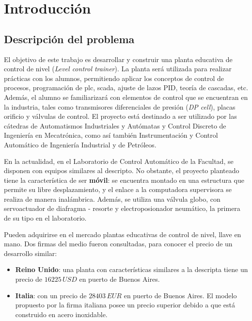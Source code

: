\chapter{Introducción}
\label{ch:intro}

\section{Descripción del problema}
\label{sec:DescripcionProblema}
El objetivo de este trabajo es desarrollar y construir una planta
educativa de control de nivel
(\textit{Level control trainer}).
La planta será utilizada para realizar prácticas con los
alumnos, permitiendo aplicar los conceptos de
control de procesos, programación de \gls{plc}, \gls{scada},
ajuste de lazos PID, teoría de cascadas, etc.
Además, el alumno se familiarizará con elementos de control que
se encuentran en la industria, tales como transmisores diferenciales de presión
(\textit{DP cell}), placas orificio y válvulas de control.
El proyecto está destinado a ser utilizado por las cátedras de
Automatismos Industriales y Autómatas y Control Discreto de
Ingeniería en Mecatrónica,
como así también Instrumentación y Control Automático de Ingeniería Industrial
y de Petróleos.

En la actualidad, en el Laboratorio de Control Automático de la Facultad, 
se disponen con equipos similares al descripto.
No obstante, el proyecto planteado tiene la característica de ser 
\textbf{móvil}: se encuentra montado en una estructura que 
permite su libre desplazamiento, y el enlace a la
computadora supervisora se realiza de manera inalámbrica.
Además, se utiliza una válvula globo, con servoactuador de diafragma - resorte
y electroposionador neumático, la primera de su tipo en el laboratorio.

Pueden adquirirse en el mercado plantas educativas de control de nivel, llave
en mano.
Dos firmas del medio fueron consultadas, para conocer 
el precio de un desarrollo similar:
\begin{itemize}
 \item \textbf{Reino Unido}: una planta con características similares
 a la descripta tiene un precio de $16225\,USD$ en puerto de Buenos Aires.
 \item \textbf{Italia}: con un precio de $28403\,EUR$ en puerto de Buenos
Aires.
 El modelo propuesto por la firma italiana
 posee un precio superior debido a que está construido en acero inoxidable.
\end{itemize}

